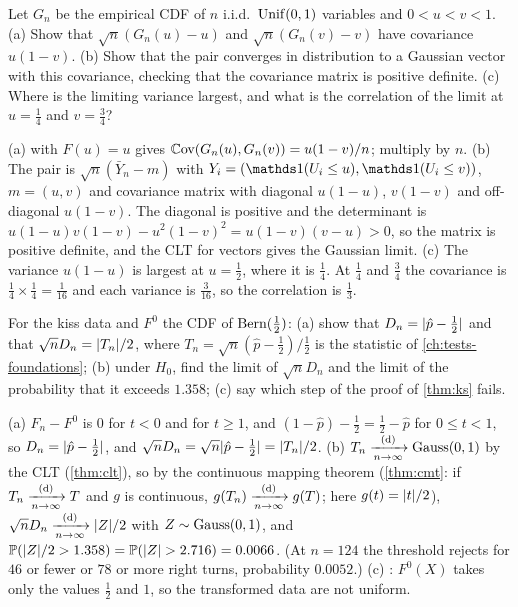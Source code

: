 \begin{exercise}
\label{ex:ks-cov}
Let $G_n$ be the empirical CDF of $n$ i.i.d.\ $\mathrm{Unif}(0, 1)$ variables and $0 < u < v < 1$. (a) Show that $\sqrt{n}(G_n(u) - u)$ and $\sqrt{n}(G_n(v) - v)$ have covariance $u(1 - v)$. (b) Show that the pair converges in distribution to a Gaussian vector with this covariance, checking that the covariance matrix is positive definite. (c) Where is the limiting variance largest, and what is the correlation of the limit at $u = \frac14$ and $v = \frac34$?
\end{exercise}
\begin{solution}
(a)  with $F(u) = u$ gives $\operatorname*{\mathbb{C}\text{ov}}(G_n(u), G_n(v)) = u(1 - v)/n$; multiply by $n$. (b) The pair is $\sqrt{n}(\bar{Y}_n - m)$ with $Y_i = (\ind(U_i \leq u), \ind(U_i \leq v))$, $m = (u, v)$ and covariance matrix with diagonal $u(1 - u)$, $v(1 - v)$ and off-diagonal $u(1 - v)$. The diagonal is positive and the determinant is $u(1 - u)v(1 - v) - u^2(1 - v)^2 = u(1 - v)(v - u) > 0$, so the matrix is positive definite, and the CLT for vectors gives the Gaussian limit. (c) The variance $u(1 - u)$ is largest at $u = \frac12$, where it is $\frac14$. At $\frac14$ and $\frac34$ the covariance is $\frac14 \times \frac14 = \frac1{16}$ and each variance is $\frac3{16}$, so the correlation is $\frac13$.
\end{solution}

\begin{exercise}
\label{ex:ks-discrete}
For the kiss data and $F^0$ the CDF of $\text{Bern}(\frac12)$: (a) show that $D_n = \lvert\hat{p} - \frac12\rvert$ and that $\sqrt{n}D_n = \lvert T_n\rvert/2$, where $T_n = \sqrt{n}(\hat{p} - \frac12)/\frac12$ is the statistic of \cref{ch:tests-foundations}; (b) under $H_0$, find the limit of $\sqrt{n}D_n$ and the limit of the probability that it exceeds $1.358$; (c) say which step of the proof of \cref{thm:ks} fails.
\end{exercise}
\begin{solution}
(a) $F_n - F^0$ is $0$ for $t < 0$ and for $t \geq 1$, and $(1 - \hat{p}) - \frac12 = \frac12 - \hat{p}$ for $0 \leq t < 1$, so $D_n = \lvert\hat{p} - \frac12\rvert$, and $\sqrt{n}D_n = \sqrt{n}\lvert\hat{p} - \frac12\rvert = \lvert T_n\rvert/2$. (b) $T_n \xrightarrow [n \to \infty ]{\text{(d)}} \text{Gauss}(0, 1)$ by the CLT (\cref{thm:clt}), so by the continuous mapping theorem (\cref{thm:cmt}: if $T_n \xrightarrow [n \to \infty ]{\text{(d)}} T$ and $g$ is continuous, $g(T_n) \xrightarrow [n \to \infty ]{\text{(d)}} g(T)$; here $g(t) = \lvert t\rvert/2$), $\sqrt{n}D_n \xrightarrow [n \to \infty ]{\text{(d)}} \lvert Z\rvert/2$ with $Z \sim \text{Gauss}(0, 1)$, and $\mathbb{P}(\lvert Z\rvert/2 > 1.358) = \mathbb{P}(\lvert Z\rvert > 2.716) = 0.0066$. (At $n = 124$ the threshold rejects for $46$ or fewer or $78$ or more right turns, probability $0.0052$.) (c) : $F^0(X)$ takes only the values $\frac12$ and $1$, so the transformed data are not uniform.
\end{solution}

